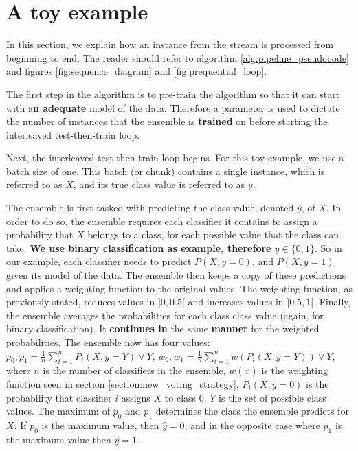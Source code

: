 
\section{A toy example}

In this section, we explain how an instance from the stream is processed from beginning to end. The reader should refer to algorithm \ref{alg:pipeline_pseudocode} and figures \ref{fig:sequence_diagram} and \ref{fig:prequential_loop}.

The first step in the algorithm is to pre-train the algorithm so that it can start with a\textbf{n adequate} model of the data. Therefore a parameter is used to dictate the number of instances that the ensemble is \textbf{trained} on before starting the interleaved test-then-train loop.

Next, the interleaved test-then-train loop begins. For this toy example, we use a batch size of one. This batch (or chunk) contains a single instance, which is referred to as $X$, and its true class value is referred to as $y$.

The ensemble is first tasked with predicting the class value, denoted $\hat{y}$, of $X$. In order to do so, the ensemble requires each classifier it contains to assign a probability that $X$ belongs to a class, for each possible value that the class can take. \textbf{We use binary classification as example, therefore $y \in \{0,1\}$}. So in our example, each classifier needs to predict $P(X, y=0)$, and $P(X, y=1)$ given its model of the data. The ensemble then keeps a copy of these predictions and applies a weighting function to the original values. The weighting function, as previously stated, reduces values in $]0,0.5[$ and increases values in $]0.5, 1[$. Finally, the ensemble averages the probabilities for each class class value (again, for binary classification). It \textbf{continues in} the same \textbf{manner} for the weighted probabilities. The ensemble now has four values: $p_0, p_1 = \frac{1}{n}\sum_{i=1}^{n} P_i(X, y=Y)\ \forall\ Y$,  $w_0,w_1=\frac{1}{n}\sum_{i=1}^{n} w(P_i(X, y=Y))\ \forall\ Y$, where $n$ is the number of classifiers in the ensemble, $w(x)$ is the weighting function seen in section \ref{section:new_voting_strategy}, $P_i(X, y=0)$ is the probability that classifier $i$ assigns $X$ to class $0$. $Y$ is the set of possible class values.
The maximum of $p_0$ and $p_1$ determines the class the ensemble predicts for $X$. If $p_0$ is the maximum value, then $\hat{y}=0$, and in the opposite case where $p_1$ is the maximum value then $\hat{y}=1$.

